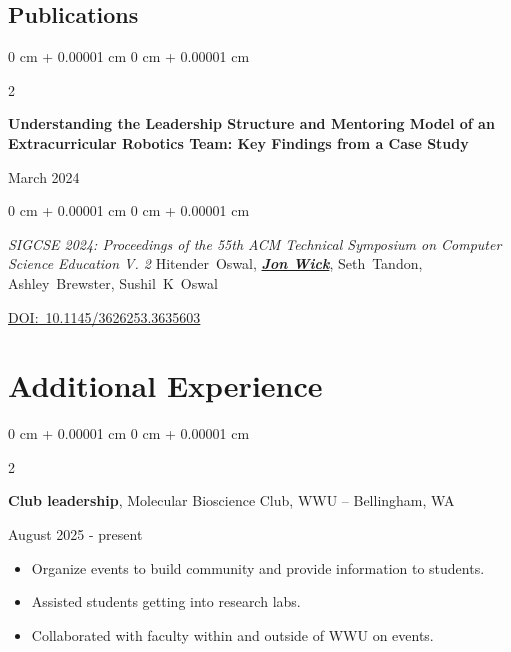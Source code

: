 \documentclass[10pt, article]{article}
\newenvironment{highlights}{
    \begin{itemize}[
        topsep=0.10 cm,
        parsep=0.10 cm,
        partopsep=0pt,
        itemsep=0pt,
        leftmargin=0 cm + 10pt
    ]
}{
    \end{itemize}
} %
\newenvironment{onecolentry}{
    \begin{adjustwidth}{
        0 cm + 0.00001 cm
    }{
        0 cm + 0.00001 cm
    }
}{
    \end{adjustwidth}
} %
\newenvironment{twocolentry}[2][]{
    \onecolentry
    \def\secondColumn{#2}
    \setcolumnwidth{\fill, 4.5 cm}
    \begin{paracol}{2}
}{
    \switchcolumn \raggedleft \secondColumn
    \end{paracol}
    \endonecolentry
} %
\let\hrefWithoutArrow\href
\begin{document}
\begin{samepage}
   \begin{samepage}
      \section{Publications}




         \begin{twocolentry}{
             March 2024
         }
             \textbf{Understanding the Leadership Structure and Mentoring Model of an Extracurricular Robotics Team: Key Findings from a Case Study}
         \end{twocolentry}

         \vspace{0.10 cm}

         \begin{onecolentry}
             \textit{SIGCSE 2024: Proceedings of the 55th ACM Technical Symposium on Computer Science Education V. 2}
           \mbox{Hitender Oswal}, \underline{\textbf{\textit{Jon Wick}}}, \mbox{Seth Tandon}, \mbox{Ashley Brewster}, \mbox{Sushil K Oswal}

             \vspace{0.10 cm}

        \mbox{\hrefWithoutArrow{https://dl.acm.org/doi/10.1145/3626253.3635603}{DOI: 10.1145/3626253.3635603}}%
     \end{onecolentry}
    \end{samepage}

    \section{Additional Experience}

       
      \begin{twocolentry}
        {August 2025 - present}
        \textbf {Club leadership}, Molecular Bioscience Club, WWU -- Bellingham, WA
      \end{twocolentry}
        \begin{highlights}
        \item Organize events to build community and provide information to students.
        \item Assisted students getting into research labs.
        \item Collaborated with faculty within and outside of WWU on events.

            \end{highlights}


\end{samepage}
\end{document}
